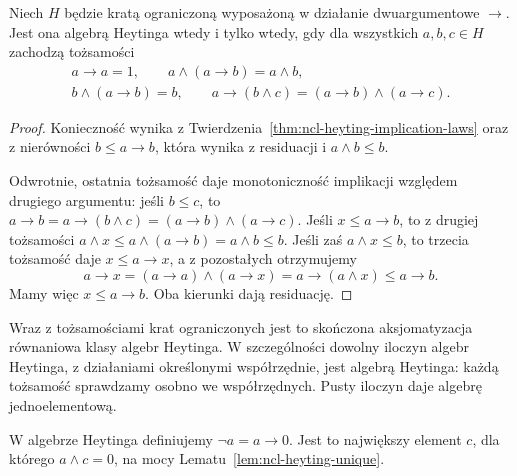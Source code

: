 \begin{stwierdzenie}
\label{prop:ncl-heyting-equational-axioms}
Niech $H$ będzie kratą ograniczoną wyposażoną
w działanie dwuargumentowe $\to$.
Jest ona algebrą Heytinga wtedy i tylko wtedy,
gdy dla wszystkich $a,b,c\in H$ zachodzą tożsamości
\[
\begin{gathered}
 a\to a=1,\qquad
 a\wedge(a\to b)=a\wedge b,\\
 b\wedge(a\to b)=b,\qquad
 a\to(b\wedge c)=(a\to b)\wedge(a\to c).
\end{gathered}
\]
\end{stwierdzenie}
\begin{proof}
Konieczność wynika z
Twierdzenia~\ref{thm:ncl-heyting-implication-laws}
oraz z nierówności $b\leq a\to b$,
która wynika z residuacji i $a\wedge b\leq b$.

Odwrotnie, ostatnia tożsamość daje monotoniczność
implikacji względem drugiego argumentu:
jeśli $b\leq c$, to
$a\to b=a\to(b\wedge c)=(a\to b)\wedge(a\to c)$.
Jeśli $x\leq a\to b$, to z drugiej tożsamości
$a\wedge x\leq a\wedge(a\to b)=a\wedge b\leq b$.
Jeśli zaś $a\wedge x\leq b$, to trzecia
tożsamość daje $x\leq a\to x$, a z pozostałych
otrzymujemy
\[
 a\to x=(a\to a)\wedge(a\to x)
       =a\to(a\wedge x)\leq a\to b.
\]
Mamy więc $x\leq a\to b$.
Oba kierunki dają residuację.
\end{proof}
Wraz z tożsamościami krat ograniczonych
jest to skończona aksjomatyzacja równaniowa
klasy algebr Heytinga. W szczególności dowolny
iloczyn algebr Heytinga, z działaniami określonymi
współrzędnie, jest algebrą Heytinga: każdą
tożsamość sprawdzamy osobno we współrzędnych.
Pusty iloczyn daje algebrę jednoelementową.

\begin{definicja}[Pseudodopełnienie]
\label{def:ncl-heyting-negation}
W algebrze Heytinga definiujemy
$\neg a=a\to0$. Jest to największy element $c$,
dla którego $a\wedge c=0$, na mocy
Lematu~\ref{lem:ncl-heyting-unique}.
\end{definicja}

